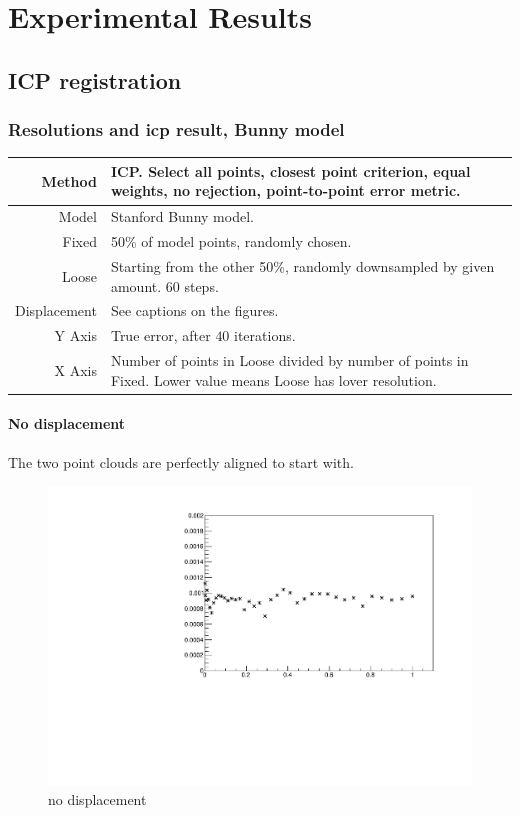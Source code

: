 \chapter{Experimental Results}
{
\setcounter{secnumdepth}{3}

\section{ICP registration}

\subsection{Resolutions and \gls{icp} result, Bunny model} \label{sec:ex_bunny_hilo}
\begin{tabularx}{\textwidth}{|r|X|} \hline
Method & ICP. Select all points, closest point criterion, equal weights, no rejection, point-to-point error metric. \\ \hline
Model & Stanford Bunny model. \\ \hline
Fixed & 50\% of model points, randomly chosen. \\ \hline
Loose & Starting from the other 50\%, randomly downsampled by given amount. $60$ steps. \\ \hline
Displacement & See captions on the figures. \\ \hline
Y Axis & True error, after $40$ iterations. \\\hline
X Axis & Number of points in Loose divided by number of points in Fixed. Lower value means Loose has lover resolution. \\ \hline
\end{tabularx}

\subsubsection{No displacement}
The two point clouds are perfectly aligned to start with.

\begin{figure}[H]
\centering
\includegraphics[width=.7\textwidth]{fig/bunny_globmin.pdf}
\caption{no displacement}
\label{fig:bunny_globmin}
\end{figure}

}
